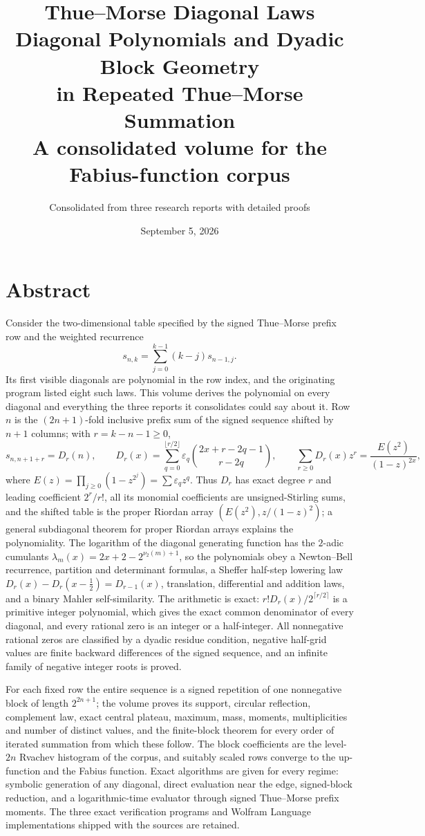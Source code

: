 \documentclass[11pt,a4paper,oneside,openany]{book}
\title{\Huge\bfseries Thue--Morse Diagonal Laws\\[4mm]
 \Large Diagonal Polynomials and Dyadic Block Geometry\\
 in Repeated Thue--Morse Summation\\[7mm]
 \large A consolidated volume for the Fabius-function corpus}
\author{Consolidated from three research reports with detailed proofs}
\date{September 5, 2026}
\numberwithin{equation}{chapter}
\theoremstyle{definition}
\theoremstyle{remark}
\newcommand{\eps}{\varepsilon}
\newcommand{\Diag}{D}
\begin{document}
\frontmatter
\hypersetup{pageanchor=false}
\maketitle
\hypersetup{pageanchor=true}
\chapter*{Abstract}
Consider the two-dimensional table specified by the signed Thue--Morse
prefix row and the weighted recurrence
\[
 s_{n,k}=\sum_{j=0}^{k-1}(k-j)s_{n-1,j}.
\]
Its first visible diagonals are polynomial in the row index, and the
originating program listed eight such laws. This volume derives the
polynomial on every diagonal and everything the three reports it
consolidates could say about it. Row $n$ is the $(2n+1)$-fold inclusive
prefix sum of the signed sequence shifted by $n+1$ columns; with
$r=k-n-1\ge0$,
\[
 s_{n,n+1+r}=\Diag_r(n),\qquad
 \Diag_r(x)=\sum_{q=0}^{\lfloor r/2\rfloor}\eps_q\binom{2x+r-2q-1}{r-2q},
 \qquad
 \sum_{r\ge0}\Diag_r(x)z^r=\frac{E(z^2)}{(1-z)^{2x}},
\]
where $E(z)=\prod_{j\ge0}(1-z^{2^j})=\sum\eps_qz^q$. Thus $\Diag_r$ has exact
degree $r$ and leading coefficient $2^r/r!$, all its monomial coefficients
are unsigned-Stirling sums, and the shifted table is the proper Riordan
array $(E(z^2),z/(1-z)^2)$; a general subdiagonal theorem for proper Riordan
arrays explains the polynomiality. The logarithm of the diagonal generating
function has the $2$-adic cumulants $\lambda_m(x)=2x+2-2^{\nu_2(m)+1}$, so the
polynomials obey a Newton--Bell recurrence, partition and determinant
formulas, a Sheffer half-step lowering law
$\Diag_r(x)-\Diag_r(x-\tfrac12)=\Diag_{r-1}(x)$, translation, differential
and addition laws, and a binary Mahler self-similarity. The arithmetic is
exact: $r!\Diag_r(x)/2^{\lceil r/2\rceil}$ is a primitive integer polynomial,
which gives the exact common denominator of every diagonal, and every
rational zero is an integer or a half-integer. All nonnegative rational
zeros are classified by a dyadic residue condition, negative half-grid
values are finite backward differences of the signed sequence, and an
infinite family of negative integer roots is proved.

For each fixed row the entire sequence is a signed repetition of one
nonnegative block of length $2^{2n+1}$; the volume proves its support,
circular reflection, complement law, exact central plateau, maximum, mass,
moments, multiplicities and number of distinct values, and the finite-block
theorem for every order of iterated summation from which these follow. The
block coefficients are the level-$2n$ Rvachev histogram of the corpus, and
suitably scaled rows converge to the up-function and the Fabius function.
Exact algorithms are given for every regime: symbolic generation of any
diagonal, direct evaluation near the edge, signed-block reduction, and a
logarithmic-time evaluator through signed Thue--Morse prefix moments. The
three exact verification programs and Wolfram Language implementations
shipped with the sources are retained.
\end{document}
